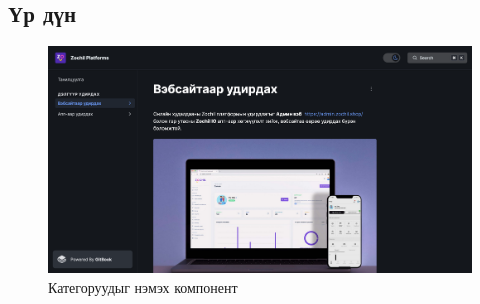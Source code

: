 \subsection{Үр дүн}
\begin{figure}[h]
	\centering
	\includegraphics[scale=0.16]{src/images/zochil-docs.png}
	\caption{Категоруудыг нэмэх компонент}
\end{figure}

